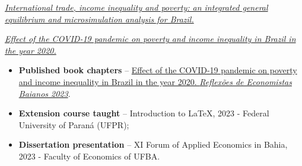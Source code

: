 \documentclass[10pt,a4paper]{cv}
\begin{document}


  \faBook \hspace{0.1cm} \href{https://acervodigital.ufpr.br/xmlui/handle/1884/88173}{\small \textit{International trade, income inequality and poverty: an integrated general equilibrium and microsimulation analysis for Brazil.}}

\divider


  \faBook \hspace{0.1cm} \href{https://repositorio.ufba.br/handle/ri/34872}{\textit{\small Effect of the COVID-19 pandemic on poverty and income inequality in Brazil in the year 2020.}}

\divider





\begin{itemize}
  \item \textbf{Published book chapters} -- \href{http://www.corecon-ba.org.br/wp-content/uploads/2023/08/Reflex%C3%B5es-Economistas-Baianos-2023_FINAL_07.08.2023_vhp-compactado-compactado.pdf}{Effect of the COVID-19 pandemic on poverty and income inequality in Brazil in the year 2020. \textit{Reflexões de Economistas Baianos 2023}}.

  \item \textbf{Extension course taught} -- Introduction to \LaTeX{}, 2023 - Federal University of Paraná (UFPR);
  
  \item \textbf{Dissertation presentation} -- XI Forum of Applied Economics in Bahia, 2023 - Faculty of Economics of UFBA.
  
\end{itemize}
\end{document}
